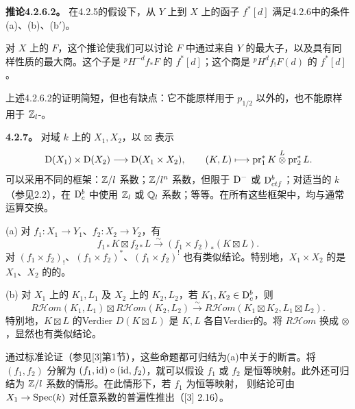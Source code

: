 \par\medskip\noindent\textbf{推论4.2.6.2。} 在4.2.5的假设下，从 $Y$ 上到 $X$ 上的函子 $f^*[d]$ 满足4.2.6中的条件(a)、(b)、(b$'$)。

对 $X$ 上的 $F$，这个推论使我们可以讨论 $F$ 中通过来自 $Y$ 的最大子，以及具有同样性质的最大商。这个子是 ${}^pH^{-d}f_*F$ 的 $f^*[d]$；这个商是 ${}^pH^df_!F(d)$ 的 $f^*[d]$。

上述4.2.6.2的证明简短，但也有缺点：它不能原样用于 $p_{1/2}$ 以外的，也不能原样用于 $\mathbb Z_l$-。

\par\medskip\noindent\textbf{4.2.7。} 对域 $k$ 上的 $X_1,X_2$，以 $\boxtimes$ 表示
\[\mathrm{D}(X_1)\times\mathrm{D}(X_2)\longrightarrow\mathrm{D}(X_1\times X_2),\qquad(K,L)\longmapsto\operatorname{pr}_1^*K\overset L\otimes\operatorname{pr}_2^*L.\]
可以采用不同的框架：$\mathbb Z/l$ 系数；$\mathbb Z/l^n$ 系数，但限于 $\mathrm{D}^-$ 或 $\mathrm{D}_{ctf}^b$；对适当的 $k$（参见2.2），在 $\mathrm{D}_c^b$ 中使用 $\mathbb Z_l$ 或 $\mathbb Q_l$ 系数；等等。在所有这些框架中，均与通常运算交换。

\noindent(a) 对 $f_1:X_1\to Y_1$、$f_2:X_2\to Y_2$，有
\[f_{1*}K\boxtimes f_{2*}L\xrightarrow\sim(f_1\times f_2)_*(K\boxtimes L).\]
对 $(f_1\times f_2)_!$、$(f_1\times f_2)^*$、$(f_1\times f_2)^!$ 也有类似结论。特别地，$X_1\times X_2$ 的是 $X_1$、$X_2$ 的的。

\noindent(b) 对 $X_1$ 上的 $K_1,L_1$ 及 $X_2$ 上的 $K_2,L_2$，若 $K_1,K_2\in\mathrm{D}_c^b$，则
\[R\mathcal Hom(K_1,L_1)\boxtimes R\mathcal Hom(K_2,L_2)\xrightarrow\sim R\mathcal Hom(K_1\boxtimes K_2,L_1\boxtimes L_2).\]
特别地，$K\boxtimes L$ 的Verdier $D(K\boxtimes L)$ 是 $K,L$ 各自Verdier的。将 $R\mathcal Hom$ 换成 $\otimes$，显然也有类似结论。

通过标准论证（参见[3]第1节），这些命题都可归结为(a)中关于的断言。将 $(f_1,f_2)$ 分解为 $(f_1,\operatorname{id})\circ(\operatorname{id},f_2)$，就可以假设 $f_1$ 或 $f_2$ 是恒等映射。此外还可归结为 $\mathbb Z/l$ 系数的情形。在此情形下，若 $f_1$ 为恒等映射，
则结论可由 $X_1\to\operatorname{Spec}(k)$ 对任意系数的普遍性推出（[3] 2.16）。

